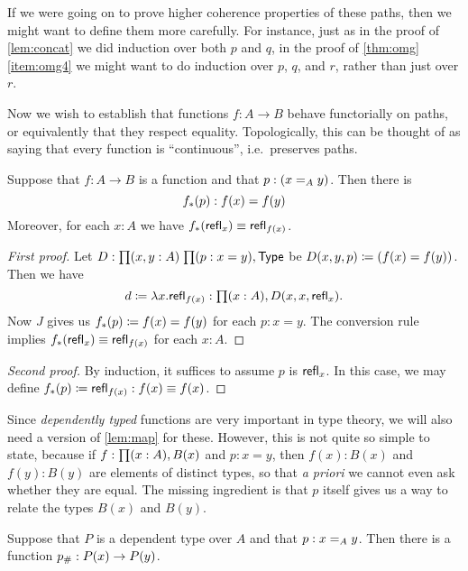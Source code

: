 \begin{rmk}
  If we were going on to prove higher coherence properties of these paths, then we might want to define them more carefully.
  For instance, just as in the proof of \autoref{lem:concat} we did induction over both $p$ and $q$, in the proof of \autoref{thm:omg}\ref{item:omg4} we might want to do induction over $p$, $q$, and $r$, rather than just over $r$.
\end{rmk}

Now we wish to establish that functions $f:A\to B$ behave functorially on paths, or equivalently that they respect equality.
Topologically, this can be thought of as saying that every function is ``continuous'', i.e.\ preserves paths.

\begin{lem}\label{lem:map}
  Suppose that $f:A\to B$ is a function and that $p:(\id[A]xy)$. Then there is
  \begin{equation*}
    \map f p : f(x)= f(y)
  \end{equation*}
  Moreover, for each $x:A$ we have $\map {f}{\refl{x}}\jdeq \refl{f(x)}$.
\end{lem}

\begin{proof}[First proof]
  Let $D:\prd{x,y:A}{p:x=y}\type$ be $D(x,y,p)\defeq (f(x)= f(y))$.
  Then we have
  \begin{equation*}
    d\defeq\lambda x.\refl{f(x)}:\prd{x:A} D(x,x,\refl{x}).
  \end{equation*}
  Now $J$ gives us $\map f p\defeq f(x)= f(y)$ for each $p:x= y$.
  The conversion rule implies $\map f{\refl{x}}\jdeq\refl{f(x)}$ for each $x:A$.
\end{proof}

\begin{proof}[Second proof]
  By induction, it suffices to assume $p$ is $\refl{x}$.
  In this case, we may define $\map f p \defeq \refl{f(x)}:f(x)\jdeq f(x)$.
\end{proof}

Since \emph{dependently typed} functions are very important in type theory, we will also need a version of \autoref{lem:map} for these.
However, this is not quite so simple to state, because if $f:\prd{x:A} B(x)$ and $p:x=y$, then $f(x):B(x)$ and $f(y):B(y)$ are elements of distinct types, so that \emph{a priori} we cannot even ask whether they are equal.
The missing ingredient is that $p$ itself gives us a way to relate the types $B(x)$ and $B(y)$.

\begin{lem}[Transport]\label{lem:transport}
  Suppose that $P$ is a dependent type over $A$ and that $p:\id[A]xy$.
  Then there is a function $\transf{p}:P(x)\to P(y)$.
\end{lem}

